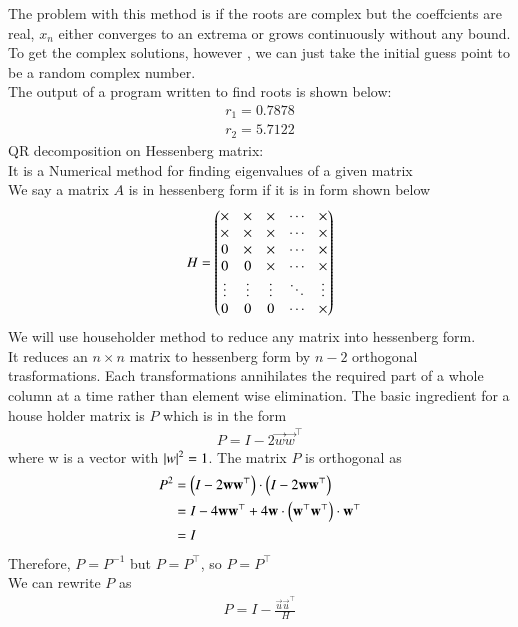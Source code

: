 \documentclass[journal]{IEEEtran}
\begin{document}
The problem with this method is if the roots are complex but the coeffcients are real, $x_n$ either converges to an extrema or grows continuously without any bound.
To get the complex solutions, however , we can just take the initial guess point to be a 
random complex number.\\
The output of a program written to find roots is shown below:
\begin{align}
	r_1 = 0.7878\\
	r_2 = 5.7122
\end{align}
QR decomposition on Hessenberg matrix:\\
It is a Numerical method for finding eigenvalues of a given matrix\\
We say a matrix $A$ is in hessenberg form if it is in form shown below
\begin{align}
H = 
\begin{pmatrix}
\times & \times & \times & \cdots & \times \\
\times & \times & \times & \cdots & \times \\
0      & \times & \times & \cdots & \times \\
0      & 0      & \times & \cdots & \times \\
\vdots & \vdots & \vdots & \ddots & \vdots \\
0      & 0      & 0      & \cdots & \times
\end{pmatrix}
\end{align}
We will use householder method to reduce any matrix into hessenberg form.\\
It reduces an $n\times n$ matrix to hessenberg form by $n-2$ orthogonal trasformations. Each transformations annihilates the required part of a whole column at a time rather than element wise elimination. The basic ingredient for a house holder matrix is $P$ which is in the form
\begin{align}
	P = I-2\vec{w}\vec{w}^\top
\end{align}
where w is a vector with $\left\vert w\right\vert^2=1$. The matrix $P$ is orthogonal as
\begin{align}
P^2 &=\left(I - 2\mathbf{w}\mathbf{w}^\top\right)\cdot\left(I - 2\mathbf{w}\mathbf{w}^\top\right)\\
    &=I-4\mathbf{w}\mathbf{w}^\top + 4\mathbf{w}\cdot\left(\mathbf{w}^\top\mathbf{w}^\top\right)\cdot\mathbf{w}^\top\\
    &=I
\end{align}
Therefore, $P=P^{-1}$ but $P = P^\top$, so $P = P^\top$ \\
We can rewrite $P$ as
\begin{align}
	P = I - \frac{\vec{u}\vec{u}^\top}{H}
\end{align}
\end{document}
